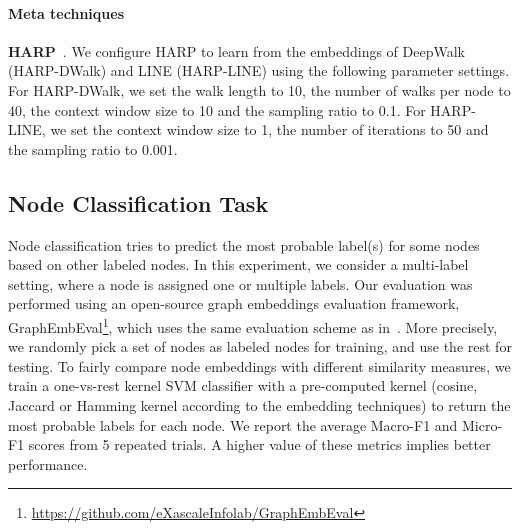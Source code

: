 \documentclass[conference]{IEEEtran}
\newcommand{\urlGembev}{\url{https://github.com/eXascaleInfolab/GraphEmbEval}\xspace}  \newcommand{\xms}{xmeasures\xspace}  \newcommand{\urlXms}{\url{https://github.com/eXascaleInfolab/xmeasures}\xspace}
\begin{document}
\paragraph{Meta techniques} \textbf{HARP}~\cite{Harp18}.
We configure HARP to learn from the embeddings of DeepWalk (HARP-DWalk) and LINE (HARP-LINE) using the following parameter settings. For HARP-DWalk, we set the walk length to 10, the number of walks per node to 40, the context window size to 10 and the sampling ratio to 0.1. For HARP-LINE, we set the context window size to 1, the number of iterations to 50 and the sampling ratio to 0.001.



\subsection{Node Classification Task}

Node classification tries to predict the most probable label(s) for some nodes based on other labeled nodes. In this experiment, we consider a multi-label setting, where a node is assigned one or multiple labels. Our evaluation was performed using an open-source graph embeddings evaluation framework, GraphEmbEval\footnote{\urlGembev\label{ftn:gembev}}, which uses the same evaluation scheme as in~\cite{Dpwk14,nd2v16,cao2015grarep}. More precisely, we randomly pick a set of nodes as labeled nodes for training, and use the rest for testing. To fairly compare node embeddings with different similarity measures, we train a one-vs-rest kernel SVM classifier with a pre-computed kernel (cosine, Jaccard or Hamming kernel according to the embedding techniques) to return the most probable labels for each node. We report the average Macro-F1 and Micro-F1 scores from 5 repeated trials. A higher value of these metrics implies better performance.
\end{document}

